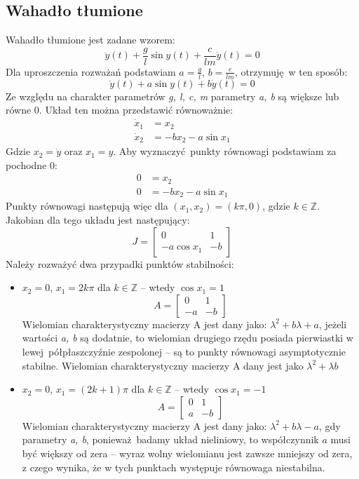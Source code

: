 \documentclass[a4paper, 10pt]{article}
\begin{document}
		\subsection{Wahadło tłumione}
			Wahadło tłumione jest zadane wzorem:
			$$
				\ddot{y}(t) + \frac{g}{l} \sin y(t) + \frac{c}{lm} \dot{y}(t) = 0
			$$
			Dla uproszczenia rozważań podstawiam $a = \frac{g}{l}$, $b = \frac{c}{lm}$, otrzymuję w ten sposób:
			$$
				\ddot{y}(t) + a \sin y(t) + b \dot{y}(t) = 0
			$$
			Ze względu na charakter parametrów \textit{g, l, c, m} parametry \textit{a, b} są większe lub równe 0. Układ ten można przedstawić równoważnie:
			$$
				\begin{aligned}
					\dot{x}_1 & = x_2 \\
					\dot{x}_2 & = - b x_2 - a \sin x_1 
				\end{aligned}
			$$
			Gdzie $x_2 = \dot{y}$ oraz $x_1 = y$. Aby wyznaczyć punkty równowagi podstawiam za pochodne 0:
			$$
				\begin{aligned}
					0 & = x_2 \\
					0 & = - b x_2 - a \sin x_1
				\end{aligned}
			$$
			Punkty równowagi następują więc dla $(x_1, x_2) = (k \pi, 0)$, gdzie $k \in \mathbb{Z}$. Jakobian dla tego układu jest następujący:
			$$
				J = \begin{bmatrix}
					0 & 1 \\
					- a \cos x_1 & -b
				\end{bmatrix}
			$$
			Należy rozważyć dwa przypadki punktów stabilności:
			\begin{itemize}
				\item[] $x_2 = 0$, $x_1 = 2k \pi$ dla $k \in \mathbb{Z}$ -- wtedy $\cos x_1 = 1$
					$$
						A = \begin{bmatrix}
							0 & 1 \\
							- a  & -b
						\end{bmatrix}
					$$
					Wielomian charakterystyczny macierzy A jest dany jako: $\lambda^2 + b\lambda + a$, jeżeli wartości \textit{a, b} są dodatnie, to wielomian drugiego rzędu posiada pierwiastki w lewej półpłaszczyźnie zespolonej -- są to punkty równowagi asymptotycznie stabilne.
					Wielomian charakterystyczny macierzy A dany jest jako $\lambda^2 + \lambda b$
				\item[] $x_2 = 0$, $x_1 = (2k + 1) \pi$ dla $k \in \mathbb{Z}$ -- wtedy $\cos x_1 = -1$
					$$
						A = \begin{bmatrix}
							0 & 1 \\
							a  & -b
						\end{bmatrix}
					$$
					Wielomian charakterystyczny macierzy A jest dany jako: $\lambda^2 + b\lambda - a$, gdy parametry \textit{a, b}, ponieważ badamy układ nieliniowy, to współczynnik $a$ musi być większy od zera -- wyraz wolny wielomianu jest zawsze mniejszy od zera, z czego wynika, że w tych punktach występuje równowaga niestabilna.
			\end{itemize}
\end{document}
